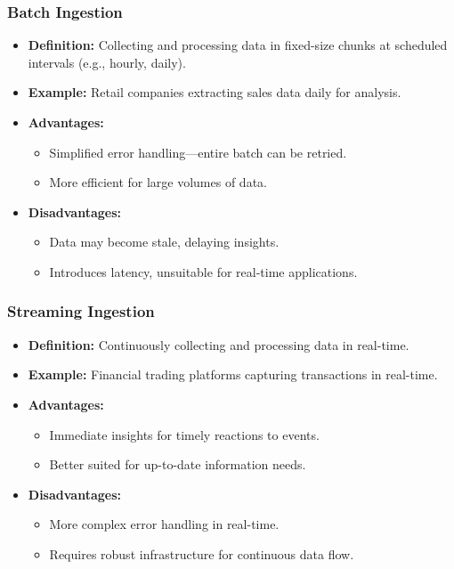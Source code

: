 \documentclass[aspectratio=169]{beamer}
\begin{document}
\begin{frame}[fragile]
    \frametitle{Batch Ingestion}
    \begin{itemize}
        \item \textbf{Definition:} Collecting and processing data in fixed-size chunks at scheduled intervals (e.g., hourly, daily).
        \item \textbf{Example:} Retail companies extracting sales data daily for analysis.
        \item \textbf{Advantages:} 
        \begin{itemize}
            \item Simplified error handling—entire batch can be retried.
            \item More efficient for large volumes of data.
        \end{itemize}
        \item \textbf{Disadvantages:} 
        \begin{itemize}
            \item Data may become stale, delaying insights.
            \item Introduces latency, unsuitable for real-time applications.
        \end{itemize}
    \end{itemize}
\end{frame}

\begin{frame}[fragile]
    \frametitle{Streaming Ingestion}
    \begin{itemize}
        \item \textbf{Definition:} Continuously collecting and processing data in real-time.
        \item \textbf{Example:} Financial trading platforms capturing transactions in real-time.
        \item \textbf{Advantages:} 
        \begin{itemize}
            \item Immediate insights for timely reactions to events.
            \item Better suited for up-to-date information needs.
        \end{itemize}
        \item \textbf{Disadvantages:} 
        \begin{itemize}
            \item More complex error handling in real-time.
            \item Requires robust infrastructure for continuous data flow.
        \end{itemize}
    \end{itemize}
\end{frame}
\end{document}
